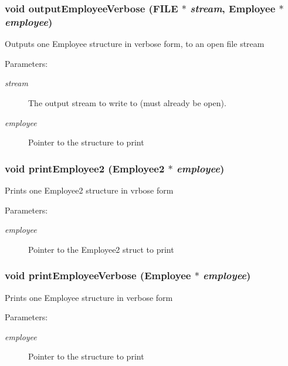 \subsubsection{\setlength{\rightskip}{0pt plus 5cm}void output\-Employee\-Verbose (FILE $\ast$ {\em stream}, \bf{Employee} $\ast$ {\em employee})}\label{func_8c_724c7914065fffbb2da47f446b1227ea}


Outputs one Employee structure in verbose form, to an open file stream \begin{Desc}
\item[Parameters:]
\begin{description}
\item[{\em stream}]The output stream to write to (must already be open). \item[{\em employee}]Pointer to the structure to print \end{description}
\end{Desc}
\subsubsection{\setlength{\rightskip}{0pt plus 5cm}void print\-Employee2 (\bf{Employee2} $\ast$ {\em employee})}\label{func_8c_fbc71af706444231a039d530cf076272}


Prints one Employee2 structure in vrbose form \begin{Desc}
\item[Parameters:]
\begin{description}
\item[{\em employee}]Pointer to the Employee2 struct to print \end{description}
\end{Desc}
\subsubsection{\setlength{\rightskip}{0pt plus 5cm}void print\-Employee\-Verbose (\bf{Employee} $\ast$ {\em employee})}\label{func_8c_4d9da5be2623d2f7814ac0345dbe1733}


Prints one Employee structure in verbose form \begin{Desc}
\item[Parameters:]
\begin{description}
\item[{\em employee}]Pointer to the structure to print \end{description}
\end{Desc}
